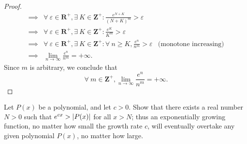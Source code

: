 \begin{proof}
\begin{align*}
        \implies & \forall\ \varepsilon \in \mathbf{R}^+, \exists\ K \in \mathbf{Z}^+ : \frac{e^{N + K}}{(N + K)^m} > \varepsilon                                                              \\
        \implies & \forall\ \varepsilon \in \mathbf{R}^+, \exists\ K \in \mathbf{Z}^+ : \frac{e^K}{K^m} > \varepsilon                                                                          \\
        \implies & \forall\ \varepsilon \in \mathbf{R}^+, \exists\ K \in \mathbf{Z}^+ : \forall\ n \geq K, \frac{e^n}{n^m} > \varepsilon                        & \text{(monotone increasing)} \\
        \implies & \lim_{n \to \infty} \frac{e^n}{n^m} = +\infty.
    \end{align*}
    Since \(m\) is arbitrary, we conclude that
    \[
        \forall\ m \in \mathbf{Z}^+, \lim_{n \to \infty} \frac{e^n}{n^m} = +\infty.
    \]
\end{proof}

\begin{exercise}\label{ex 4.5.9}
    Let \(P(x)\) be a polynomial, and let \(c > 0\).
    Show that there exists a real number \(N > 0\) such that \(e^{cx} > \abs*{P(x)}\) for all \(x > N\);
    thus an exponentially growing function, no matter how small the growth rate \(c\), will eventually overtake any given polynomial \(P(x)\), no matter how large.
\end{exercise}

